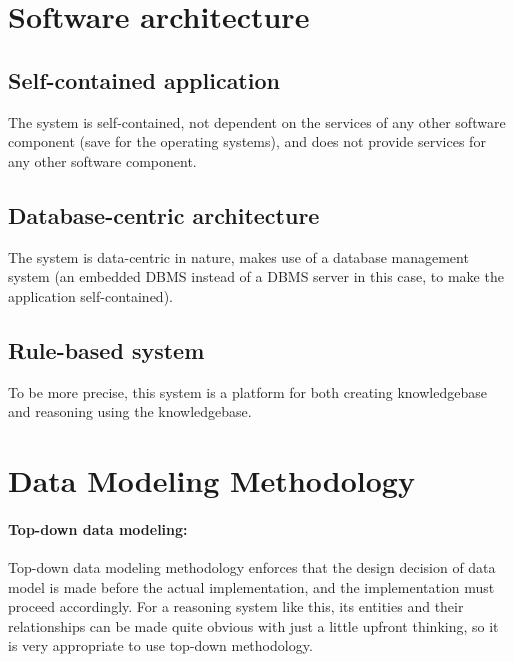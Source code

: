 \documentclass[../gr-final.tex]{subfiles}
\begin{document}
\section{Software architecture}
\subsection{Self-contained application} The system is self-contained,
not dependent on the services of any other software component (save
for the operating systems), and does not provide services for any
other software component. 
\subsection{Database-centric architecture} The system is data-centric
in nature, makes use of a database management system (an embedded DBMS
instead of a DBMS server in this case, to make the application
self-contained).
\subsection{Rule-based system} To be more precise, this system is a
platform for both creating knowledgebase and reasoning using the knowledgebase.

\section{Data Modeling Methodology}
\paragraph{Top-down data modeling: } Top-down data modeling methodology enforces that the
design decision of data model is made before the actual
implementation, and the implementation must proceed accordingly. For a
reasoning system like this, its entities and their relationships can
be made quite obvious with just a little upfront thinking, so it is
very appropriate to use top-down methodology.
\end{document}
